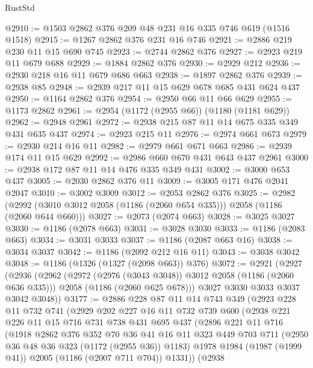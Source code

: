 \begin{lexlean}{RustStd}
\begin{coremodule}
@2910 := @1503 @2862 @376 @209 @48 @231 @16 @335 @746 @619 (@1516 @1518)
@2915 := @1267 @2862 @376 @231 @16 @746
@2921 := @2886 @219 @230 @11 @15 @690 @745
@2923 := @2744 @2862 @376
@2927 := @2923 @219 @11 @679 @688
@2929 := @1884 @2862 @376
@2930 := @2929 @212
@2936 := @2930 @218 @16 @11 @679 @686 @663
@2938 := @1897 @2862 @376
@2939 := @2938 @85
@2948 := @2939 @217 @11 @15 @629 @678 @685 @431 @624 @437
@2950 := @1164 @2862 @376
@2954 := @2950 @66 @11 @66 @629
@2955 := @1173 @2862
@2961 := @2954 (@1172 (@2955 @66)) (@1180 (@1181 @629))
@2962 := @2948 @2961
@2972 := @2938 @215 @87 @11 @14 @675 @335 @349 @431 @635 @437
@2974 := @2923 @215 @11
@2976 := @2974 @661 @673
@2979 := @2930 @214 @16 @11
@2982 := @2979 @661 @671 @663
@2986 := @2939 @174 @11 @15 @629
@2992 := @2986 @660 @670 @431 @643 @437 @2961
@3000 := @2938 @172 @87 @11 @14 @476 @335 @349 @431
@3002 := @3000 @653 @437
@3005 := @2030 @2862 @376 @11
@3009 := @3005 @171 @476 @2041 @2047
@3010 := @3002 @3009
@3012 := @2053 @2862 @376
@3025 := @2982 (@2992 (@3010 @3012 @2058 (@1186 (@2060 @654 @335))) @2058 (@1186 (@2060 @644 @660)))
@3027 := @2073 (@2074 @663)
@3028 := @3025 @3027
@3030 := @1186 (@2078 @663)
@3031 := @3028 @3030
@3033 := @1186 (@2083 @663)
@3034 := @3031 @3033
@3037 := @1186 (@2087 @663 @16)
@3038 := @3034 @3037
@3042 := @1186 (@2092 @212 @16 @11)
@3043 := @3038 @3042
@3048 := @1186 (@1326 (@1327 (@2098 @663)) @376)
@3072 := @2921
    (@2927
      (@2936
        (@2962
          (@2972 (@2976 (@3043 @3048)) @3012 @2058 (@1186 (@2060 @636 @335)))
          @2058
          (@1186 (@2060 @625 @678)))
        @3027
        @3030
        @3033
        @3037
        @3042
        @3048))
@3177 := @2886
    @228
    @87
    @11
    @14
    @743
    @349
    (@2923
      @228
      @11
      @732
      @741
      (@2929
        @202
        @227
        @16
        @11
        @732
        @739
        @600
        (@2938
          @221
          @226
          @11
          @15
          @716
          @731
          @738
          @431
          @695
          @437
          (@2896
            @221
            @11
            @716
            (@1918
              @2862
              @376
              @352
              @70
              @36
              @41
              @16
              @11
              @323
              @449
              @703
              @711
              (@2950 @36 @48 @36 @323 (@1172 (@2955 @36)) @1183)
              @1978
              @1984
              (@1987 (@1999 @41))
              @2005
              (@1186 (@2007 @711 @704))
              @1331))
          (@2938

\end{coremodule}
\end{lexlean}
